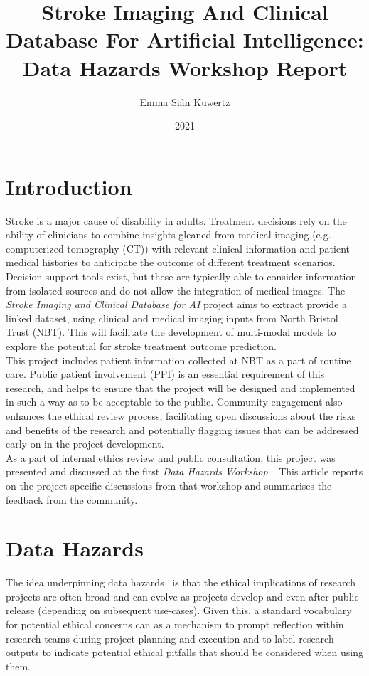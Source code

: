 \documentclass{article}
\title{Stroke Imaging And Clinical Database For Artificial
  Intelligence: Data Hazards
  Workshop Report}
\author{Emma Si\^{a}n Kuwertz}
\affil{Jean Golding Institute, University of Bristol}
\date{2021}
\begin{document}
\maketitle
\section{Introduction}

Stroke is a major cause of disability in adults. Treatment
decisions rely on the ability of clinicians to combine insights
gleaned from medical imaging (e.g. computerized tomography (CT)) with
relevant clinical information and patient medical histories to anticipate the outcome of different treatment
scenarios. Decision support tools exist, but these are typically able
to consider information from isolated sources and do not allow the
integration of medical images. The \textit{Stroke Imaging and Clinical
Database for AI} project aims to extract provide a linked dataset,
using clinical and medical imaging inputs from North Bristol Trust (NBT). 
This will facilitate the development of multi-modal models to explore the potential for stroke treatment outcome
prediction.\\

This project includes patient information collected at NBT as a part
of routine care. Public patient involvement (PPI) is an essential
requirement of this research, and helps to ensure that the project
will be designed and implemented in such a way as to be acceptable to
the public. Community engagement also enhances the ethical
review process, facilitating open discussions about the risks and
benefits of the research and potentially flagging issues that can be
addressed early on in the project development.\\

As a part of internal ethics review and public consultation, this
project was presented and discussed at the first \textit{Data Hazards
  Workshop}~\cite{data-hazards-workshop}.
This article reports on the project-specific discussions from that
workshop and summarises the feedback from the community.

\section{Data Hazards}
\label{sec:data-labels}
The idea underpinning data hazards~\cite{data-hazards} is that the ethical implications of
research projects are often broad and can evolve as projects
develop and even after public release (depending on subsequent
use-cases). Given this, a standard vocabulary for potential ethical
concerns can as a mechanism
to prompt reflection within research teams during project planning and
execution and to
label research outputs to indicate potential ethical pitfalls that should be
considered when using them. \\
\end{document}
